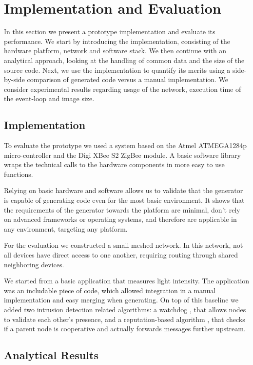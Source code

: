 \documentclass[conference]{IEEEtran}
\begin{document}
\section{Implementation and Evaluation}
\label{evaluation}

In this section we present a prototype implementation and evaluate its
performance. We start by introducing the implementation, consisting of the
hardware platform, network and software stack. We then continue with an
analytical approach, looking at the handling of common data and the size of the
source code. Next, we use the implementation to quantify its merits using a
side-by-side comparison of generated code versus a manual implementation. We
consider experimental results regarding usage of the network, execution time of
the event-loop and image size.

\subsection{Implementation}

To evaluate the prototype we used a system based on the Atmel ATMEGA1284p
micro-controller and the Digi XBee S2 ZigBee module. A basic software library
wraps the technical calls to the hardware components in more easy to use
functions.

Relying on basic hardware and software allows us to validate that the generator
is capable of generating code even for the most basic environment. It shows
that the requirements of the generator towards the platform are minimal, don't
rely on advanced frameworks or operating systems, and therefore are applicable
in any environment, targeting any platform.

For the evaluation we constructed a small meshed network. In this network, not
all devices have direct access to one another, requiring routing through shared
neighboring devices.

We started from a basic application that measures light intensity. The
application was an includable piece of code, which allowed integration in a
manual implementation and easy merging when generating. On top of this baseline
we added two intrusion detection related algorithms: a watchdog
\cite{mishra2004intrusion}, that allows nodes to validate each other's
presence, and a reputation-based algorithm \cite{ganeriwal2008reputation}, that
checks if a parent node is cooperative and actually forwards messages further
upstream.

\subsection{Analytical Results}
\end{document}
